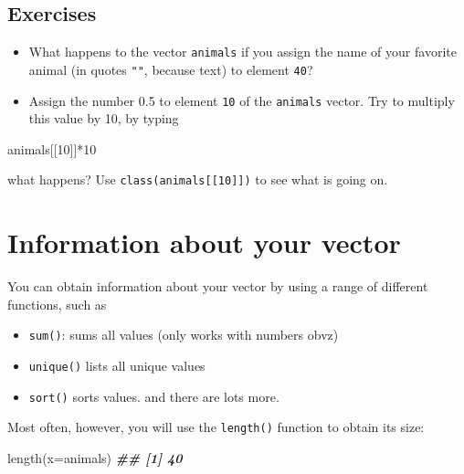 \documentclass[
]{book}
\newenvironment{Shaded}{\begin{snugshade}}{\end{snugshade}}
\newcommand{\AttributeTok}[1]{\textcolor[rgb]{0.77,0.63,0.00}{#1}}
\newcommand{\DecValTok}[1]{\textcolor[rgb]{0.00,0.00,0.81}{#1}}
\newcommand{\DocumentationTok}[1]{\textcolor[rgb]{0.56,0.35,0.01}{\textbf{\textit{#1}}}}
\newcommand{\FunctionTok}[1]{\textcolor[rgb]{0.00,0.00,0.00}{#1}}
\newcommand{\NormalTok}[1]{#1}
\newcommand{\SpecialCharTok}[1]{\textcolor[rgb]{0.00,0.00,0.00}{#1}}
\providecommand{\tightlist}{%
  \setlength{\itemsep}{0pt}\setlength{\parskip}{0pt}}
\begin{document}
\hypertarget{exercises}{%
\subsection{Exercises}\label{exercises}}

\begin{itemize}
\item
  What happens to the vector \texttt{animals} if you assign the name of your favorite animal (in quotes \texttt{""}, because text) to element \texttt{40}?
\item
  Assign the number 0.5 to element \texttt{10} of the \texttt{animals} vector. Try to multiply this value by 10, by typing
\end{itemize}

\begin{Shaded}
\begin{Highlighting}[]
\NormalTok{animals[[}\DecValTok{10}\NormalTok{]]}\SpecialCharTok{*}\DecValTok{10}
\end{Highlighting}
\end{Shaded}

what happens? Use \texttt{class(animals{[}{[}10{]}{]})} to see what is going on.

\hypertarget{information-about-your-vector}{%
\section{Information about your vector}\label{information-about-your-vector}}

You can obtain information about your vector by using a range of different functions, such as

\begin{itemize}
\tightlist
\item
  \texttt{sum()}: sums all values (only works with numbers obvz)\\
\item
  \texttt{unique()} lists all unique values\\
\item
  \texttt{sort()} sorts values.
  and there are lots more.
\end{itemize}

Most often, however, you will use the \texttt{length()} function to obtain its size:

\begin{Shaded}
\begin{Highlighting}[]
\FunctionTok{length}\NormalTok{(}\AttributeTok{x=}\NormalTok{animals)}
\DocumentationTok{\#\# [1] 40}
\end{Highlighting}
\end{Shaded}
\end{document}
